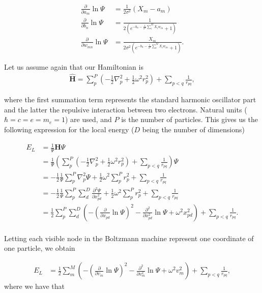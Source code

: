 \documentclass[%
oneside,                 %
final,                   %
10pt]{article}
\begin{document}
\begin{align}
	\frac{\partial }{\partial a_m} \ln\Psi
	&= 	\frac{1}{2\sigma^2} (X_m - a_m) \\
	\frac{\partial }{\partial b_n} \ln\Psi
	&=
	\frac{1}{2(e^{-b_n-\frac{1}{\sigma^2}\sum_i^M X_i w_{in}} + 1)} \\
	\frac{\partial }{\partial w_{mn}} \ln\Psi
	&= \frac{X_m}{2\sigma^2(e^{-b_n-\frac{1}{\sigma^2}\sum_i^M X_i w_{in}} + 1)}.
\end{align}


Let us assume again that our Hamiltonian is 
\begin{align}
	\hat{\mathbf{H}} = \sum_p^P (-\frac{1}{2}\nabla_p^2 + \frac{1}{2}\omega^2 r_p^2 ) + \sum_{p<q} \frac{1}{r_{pq}},
\end{align}


where the first summation term represents the standard harmonic
oscillator part and the latter the repulsive interaction between two
electrons. Natural units ($\hbar=c=e=m_e=1$) are used, and $P$ is the
number of particles. This gives us the following expression for the
local energy ($D$ being the number of dimensions)

\begin{align}
	E_L &= \frac{1}{\Psi} \mathbf{H} \Psi \\
	&= \frac{1}{\Psi} (\sum_p^P (-\frac{1}{2}\nabla_p^2 + \frac{1}{2}\omega^2 r_p^2 ) + \sum_{p<q} \frac{1}{r_{pq}}) \Psi \\
	&= -\frac{1}{2}\frac{1}{\Psi} \sum_p^P \nabla_p^2 \Psi 
	+ \frac{1}{2}\omega^2 \sum_p^P  r_p^2  + \sum_{p<q} \frac{1}{r_{pq}} \\
	&= -\frac{1}{2}\frac{1}{\Psi} \sum_p^P \sum_d^D \frac{\partial^2 \Psi}{\partial x_{pd}^2} + \frac{1}{2}\omega^2 \sum_p^P  r_p^2  + \sum_{p<q} \frac{1}{r_{pq}} \\
	&= \frac{1}{2} \sum_p^P \sum_d^D (-(\frac{\partial}{\partial x_{pd}} \ln\Psi)^2 -\frac{\partial^2}{\partial x_{pd}^2} \ln\Psi + \omega^2 x_{pd}^2)  + \sum_{p<q} \frac{1}{r_{pq}}. \\
\end{align}


Letting each visible node in the Boltzmann machine 
represent one coordinate of one particle, we obtain

\begin{align}
	E_L &=
	\frac{1}{2} \sum_m^M (-(\frac{\partial}{\partial v_m} \ln\Psi)^2 -\frac{\partial^2}{\partial v_m^2} \ln\Psi + \omega^2 v_m^2)  + \sum_{p<q} \frac{1}{r_{pq}},
\end{align}
where we have that
\end{document}
